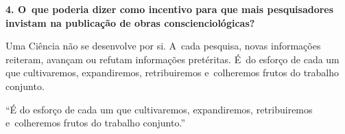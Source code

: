 \documentclass{gescons}
\begin{document}
\begin{multicols}{2}
\textbf{4. O~que poderia dizer como incentivo para que mais pesquisadores invistam na publicação de obras conscienciológicas?}

Uma Ciência não se desenvolve por si. A~cada pesquisa, novas informações reiteram, avançam ou refutam informações pretéritas. É~do esforço de cada um que cultivaremos, expandiremos, retribuiremos e~colheremos frutos do trabalho conjunto.


\begin{pullquote}
``É do esforço de cada um que cultivaremos, expandiremos, retribuiremos e~colheremos frutos do trabalho conjunto.''
\end{pullquote}

    
    \end{multicols}
\end{document}
